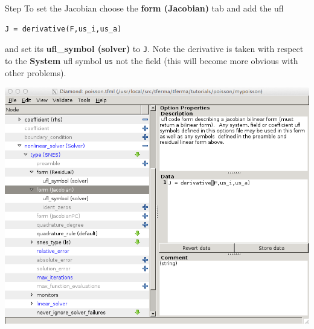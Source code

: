 \begin{steps}{Step}
To set the Jacobian choose  the \textbf{form (Jacobian)} tab and add
the ufl
\begin{lstlisting}[style=ufl]
J = derivative(F,us_i,us_a)
\end{lstlisting}
and set its \textbf{ufl\_symbol (solver)} to \texttt{J}.  Note the derivative is taken
with respect to the \textbf{System} ufl symbol \texttt{us} not the
field (this will become more obvious with other problems).
\begin{center}
    \includegraphics[width=\diamondwidth]{figures/screendumps/diamond_poisson_11d.png}
\end{center}


\end{steps}
